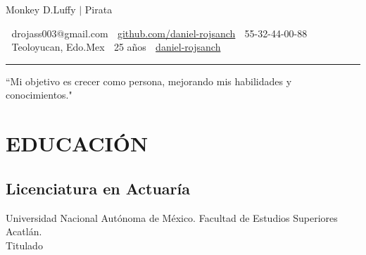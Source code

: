 \documentclass[10pt,letterpaper]{article}
\begin{document}
\color{txt}

\begin{center}
    \Large{ \textcolor{title}{ Monkey D.Luffy }$|$ \Large{Pirata}\\
    \vspace{5pt}}
  
\small{
  \textcolor{info}{
    {\ttfamily }\hspace{0.1cm} drojass003@gmail.com \hspace{0.38cm}
    {\ttfamily }\hspace{0.15cm} \href{https://github.com/daniel-rojsanch}{ github.com/daniel-rojsanch}\hspace{0.38cm}
    {\ttfamily }\hspace{0.1cm} 55-32-44-00-88}\\
 
    \textcolor{info}{
    {\ttfamily }\hspace{0.1cm} Teoloyucan, Edo.Mex\hspace{0.38cm} 
    {\ttfamily }\hspace{0.1cm} 25 años\hspace{0.38cm}
    {\ttfamily }\hspace{0.15cm} \href{https://www.linkedin.com/in/daniel-rojsanch/}{daniel-rojsanch}}
    }\\
\vspace{0.7mm}
\textcolor{title}{\noindent\rule{14cm}{0.1pt}}

\end{center}


\vspace{0.7mm}

\begin{center}
``Mi objetivo es crecer como persona, mejorando mis habilidades y conocimientos."
\end{center}

\vspace{1.5mm}
\section*{EDUCACIÓN}
\vspace{2mm}
\subsection*{Licenciatura en Actuaría}
Universidad Nacional Autónoma de México. Facultad de Estudios Superiores Acatlán.\\
Titulado
\vspace{2mm}
\end{document}

